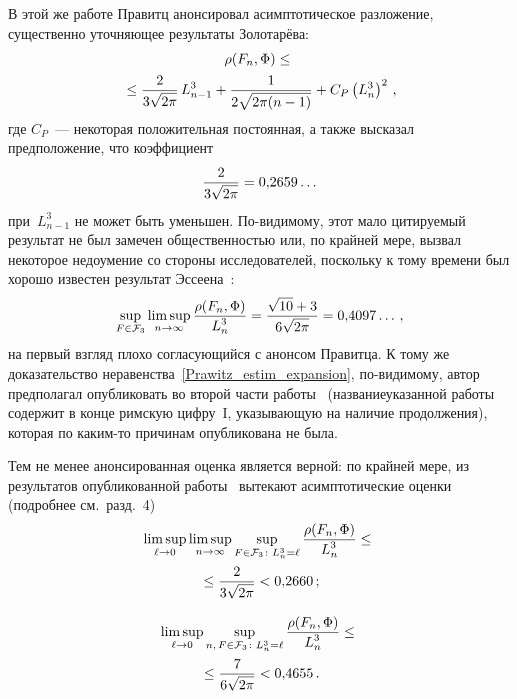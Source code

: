 \begin{multicols}{2}
В этой же работе Правитц анонсировал асимптотическое разложение,
существенно уточняющее результаты Золотарёва:
\begin{multline}
\label{Prawitz_estim_expansion}
\rho(F_n,\Phi)\le{}\\
{}\le
 \displaystyle\frac{\displaystyle 2\mathstrut}{\displaystyle 3\sqrt{2\pi}\mathstrut}\, L_{n-1}^3+
\displaystyle\frac{\displaystyle 1\mathstrut}{\displaystyle 2\sqrt{2\pi(n-1)}\mathstrut}+ C_{P}\left(L_n^3\right)^2\,,
\end{multline}
где $C_P$~--- некоторая положительная постоянная, а также высказал
предположение, что коэффициент
$$
\displaystyle\frac{\displaystyle 2\mathstrut}{\displaystyle 3\sqrt{2\pi}\mathstrut}=0{,}2659\ldots
$$
при~$L_{n-1}^3$ не может быть уменьшен. По-видимому, этот мало
цитируемый результат не был замечен общественностью или, по крайней
мере, вызвал некоторое недоумение со стороны исследователей,
поскольку к тому времени был хорошо известен результат
Эссеена~\cite{Esseen1956}:
$$
\sup_{F\in{\mathcal F}_3}\limsup_{n\to\infty}\displaystyle\frac{\displaystyle \rho(F_n,\Phi)\mathstrut}{\displaystyle L_n^3\mathstrut}=
\displaystyle\frac{\displaystyle \sqrt{10}+3\mathstrut}{\displaystyle 6\sqrt{2\pi}\mathstrut}=0{,}4097\ldots\,,
$$
на первый взгляд плохо согласующийся с анонсом Правитца. К тому же
доказательство неравенства~\eqref{Prawitz_estim_expansion},
по-ви\-ди\-мо\-му, автор предполагал опуб\-ли\-ко\-вать во второй части
работы~\cite{Prawitz1975} (название\linebreak указанной работы содержит в
конце римскую циф\-ру~I, указывающую на наличие продолжения), которая
по ка\-ким-то причинам опубликована не \mbox{была}. 
{

}

Тем не менее
анонсированная оценка является верной: по крайней мере, из
результатов опубликованной работы~\cite{Prawitz1975} вытекают
асимптотические оценки (подробнее см.\ разд.~4)
\begin{multline*}
\limsup_{\ell\to0}\limsup_{n\to\infty} \sup_{F\in{\mathcal F}_3\colon
L_n^3=\ell} \displaystyle\frac{\displaystyle \rho(F_n,\Phi)\mathstrut}{\displaystyle L_n^3\mathstrut}\le{}\\
{}\le \displaystyle\frac{\displaystyle 2\mathstrut}{\displaystyle 3\sqrt{2\pi}\mathstrut}<0{,}2660\,;
\end{multline*}

\vspace*{-12pt}

\noindent
\begin{multline*}
\limsup_{\ell\to0}\sup_{n,\,F\in{\mathcal F}_3\colon L_n^3=\ell}
\displaystyle\frac{\displaystyle \rho(F_n,\Phi)\mathstrut}{\displaystyle L_n^3\mathstrut} \le{}\\
{}\le \displaystyle\frac{\displaystyle 7\mathstrut}{\displaystyle 6\sqrt{2\pi}\mathstrut}<0{,}4655\,.
\end{multline*}


\end{multicols}
